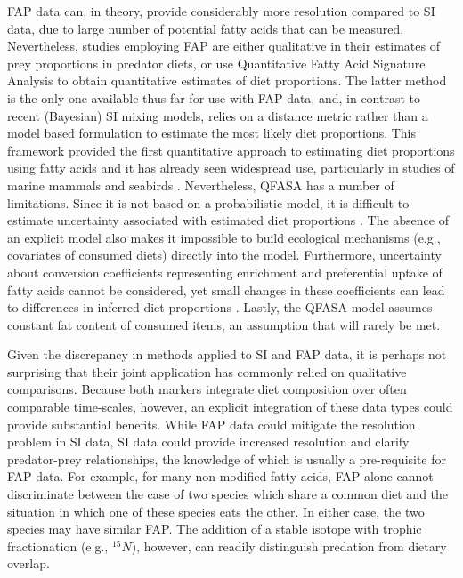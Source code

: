 \documentclass[12pt]{article}%
\begin{document}
\begin{spacing}{1.9}
\begin{flushleft}
FAP data can, in theory, provide considerably more resolution compared
to SI data, due to large number of potential fatty acids that can be
measured. Nevertheless, studies employing FAP are either qualitative
in their estimates of prey proportions in predator diets, or use
Quantitative Fatty Acid Signature Analysis \citep{iverson_quantitative_2004} to
obtain quantitative estimates of diet proportions. The latter method
is the only one available thus far for use with FAP data, and, in
contrast to recent (Bayesian) SI mixing models, relies on a distance
metric rather than a model based formulation to estimate the most
likely diet proportions. This framework provided the first
quantitative approach to estimating diet proportions using fatty acids
and it has already seen widespread use, particularly in studies of
marine mammals \citep{bowen_methods_2012} and seabirds
\citep{williams_using_2010}.  Nevertheless, QFASA has a number of
limitations. Since it is not based on a probabilistic model, it is
difficult to estimate uncertainty associated with estimated diet
proportions \citep{williams_using_2010}. The absence of an explicit model
also makes it impossible to build ecological mechanisms (e.g.,
covariates of consumed diets) directly into the model. Furthermore,
uncertainty about conversion coefficients representing enrichment and
preferential uptake of fatty acids cannot be considered, yet small
changes in these coefficients can lead to differences in inferred diet
proportions \citep{wang_validating_2010}. Lastly, the QFASA model assumes
constant fat content of consumed items, an assumption that will rarely
be met.

Given the discrepancy in methods applied to SI and FAP data, it is
perhaps not surprising that their joint application has commonly
relied on qualitative comparisons. Because both markers integrate diet
composition over often comparable time-scales, however, an explicit
integration of these data types could provide substantial
benefits. While FAP data could mitigate the resolution problem in SI
data, SI data could provide increased resolution and clarify
predator-prey relationships, the knowledge of which is usually a
pre-requisite for FAP data. For example, for many non-modified fatty
acids, FAP alone cannot discriminate between the case of two species
which share a common diet and the situation in which one of these
species eats the other.  In either case, the two species may have
similar FAP.  The addition of a stable isotope with trophic
fractionation (e.g., $^{15}N$), however, can readily distinguish predation
from dietary overlap.


\end{flushleft}
\end{spacing}
\end{document}
